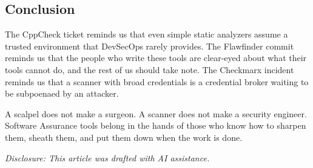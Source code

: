 \subsection*{Conclusion}

The CppCheck ticket reminds us that even simple static analyzers assume a trusted environment that DevSecOps rarely provides. The Flawfinder commit reminds us that the people who write these tools are clear-eyed about what their tools cannot do, and the rest of us should take note. The Checkmarx incident reminds us that a scanner with broad credentials is a credential broker waiting to be subpoenaed by an attacker.

A scalpel does not make a surgeon. A scanner does not make a security engineer. Software Assurance tools belong in the hands of those who know how to sharpen them, sheath them, and put them down when the work is done.

\vspace{0.5cm}
\footnotesize\textit{Disclosure: This article was drafted with AI assistance.}\normalsize{}

